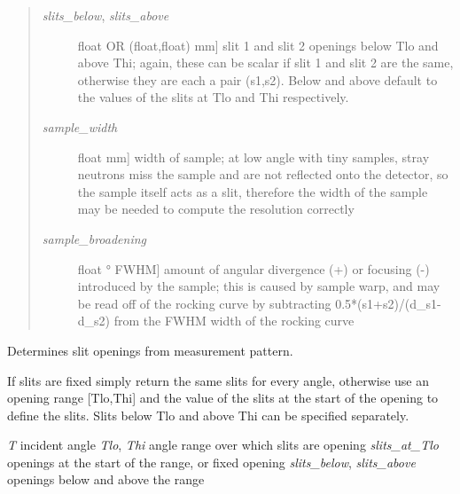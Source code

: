 \documentclass[letterpaper,10pt,english]{sphinxmanual}
\begin{document}
\begin{fulllineitems}
\begin{quote}
\begin{description}
\begin{description}
\item[{\emph{slits\_below}, \emph{slits\_above}}] \leavevmode{[}float OR (float,float) \textbar{} mm{]}
slit 1 and slit 2 openings below Tlo and above Thi; again, these
can be scalar if slit 1 and slit 2 are the same, otherwise they
are each a pair (s1,s2).  Below and above default to the values of
the slits at Tlo and Thi respectively.

\item[{\emph{sample\_width}}] \leavevmode{[}float \textbar{} mm{]}
width of sample; at low angle with tiny samples, stray neutrons
miss the sample and are not reflected onto the detector, so the
sample itself acts as a slit, therefore the width of the sample
may be needed to compute the resolution correctly

\item[{\emph{sample\_broadening}}] \leavevmode{[}float \textbar{} ° FWHM{]}
amount of angular divergence (+) or focusing (-) introduced by
the sample; this is caused by sample warp, and may be read off
of the rocking curve by subtracting 0.5*(s1+s2)/(d\_s1-d\_s2) from
the FWHM width of the rocking curve

\end{description}

\end{description}\end{quote}

\begin{fulllineitems}
\label{api/instrument:refl1d.instrument.Pulsed.calc_dT}
\end{fulllineitems}


\begin{fulllineitems}
\label{api/instrument:refl1d.instrument.Pulsed.calc_slits}
Determines slit openings from measurement pattern.

If slits are fixed simply return the same slits for every angle,
otherwise use an opening range {[}Tlo,Thi{]} and the value of the
slits at the start of the opening to define the slits.  Slits
below Tlo and above Thi can be specified separately.

\emph{T}              incident angle
\emph{Tlo}, \emph{Thi}     angle range over which slits are opening
\emph{slits\_at\_Tlo}   openings at the start of the range, or fixed opening
\emph{slits\_below}, \emph{slits\_above}   openings below and above the range


\end{fulllineitems}
\end{fulllineitems}
\end{document}
